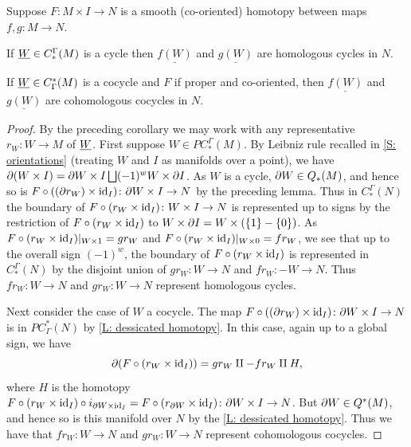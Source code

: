 \begin{corollary}\label{C: homotopy}
Suppose $F : M \times I \to N$ is a smooth (co-oriented) homotopy between maps $f,g \colon M \to N$.

If $\underline{W} \in C_*^\Gamma(M)$ is a cycle then $\underline{f(W)}$ and $\underline{g(W)}$ are homologous cycles in $N$.

If $\underline{W} \in C^*_\Gamma(M)$ is a cocycle and $F$ if proper and co-oriented, then $\underline{f(W)}$ and $\underline{g(W)}$ are cohomologous cocycles in $N$.
\end{corollary}
\begin{proof}
By the preceding corollary we may work with any representative $r_W \colon W \to M$ of $\underline{W}$. First suppose $W \in PC_*^\Gamma(M)$. By Leibniz rule recalled in \cref{S: orientations} (treating $W$ and $I$ as manifolds over a point), we have $\partial (W \times I) = \partial W \times I \bigsqcup (-1)^{w} W \times \partial I$. As $W$ is a cycle, $\partial W \in Q_*(M)$, and hence so is $F \circ ((\partial r_W) \times \mathrm{id}_I) \colon \partial W \times I \to N$ by the preceding lemma. Thus in $C^\Gamma_*(N)$ the boundary of $F \circ (r_W \times \mathrm{id}_I) \colon W \times I \to N$ is represented up to signs by the restriction of
$F \circ (r_W \times \mathrm{id}_I)$ to $W \times \partial I = W \times (\{1\}-\{0\})$. As $F \circ (r_W \times \mathrm{id}_I)|_{W \times 1} = gr_W$ and $F \circ (r_W \times \mathrm{id}_I)|_{W \times 0} = fr_W$, we see that up to the overall sign $(-1)^{w}$, the boundary of $F \circ (r_W \times \mathrm{id}_I)$ is represented in $C_*^\Gamma(N)$ by the disjoint union of $gr_W \colon W \to N$ and $fr_W:-W \to N$. Thus $fr_W \colon W \to N$ and $gr_W \colon W \to N$ represent homologous cycles.

Next consider the case of $W$ a cocycle. The map $F \circ ((\partial r_W) \times \mathrm{id}_I) \colon \partial W \times I \to N$ is in $PC^*_\Gamma(N)$ by \cref{L: dessicated homotopy}.
 In this case, again up to a global sign, we have $$\partial (F \circ (r_W \times \mathrm{id}_I)) = gr_W \amalg -fr_W \amalg H,$$ where $H$ is the homotopy $F \circ (r_W \times \mathrm{id}_I) \circ i_{\partial W \times \mathrm{id}_I} = F \circ (r_{\partial W} \times \mathrm{id}_I) \colon \partial W \times I \to N$. But $\partial W \in Q^*(M)$, and hence so is this manifold over $N$ by the \cref{L: dessicated homotopy}. Thus we have
that $fr_W \colon W \to N$ and $gr_W \colon W \to N$ represent cohomologous cocycles.
\end{proof}





